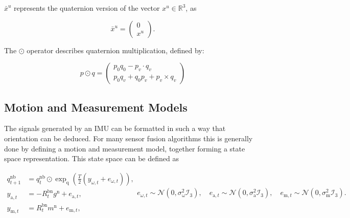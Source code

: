 $\bar{x}^u$ represents the quaternion version of the vector $x^u \in \mathbb{R}^3$, as

\begin{equation}
	\label{eq:quat_vec_ref}
	\bar{x}^u=\left(\begin{array}{l}{0} \\ {x^u}\end{array}\right).
\end{equation}


The $\odot$ operator describes quaternion multiplication, defined by:

\begin{equation}
	\label{eq:quat_multiplication}
	p \odot q=\left(\begin{array}{c}{p_{0} q_{0}-p_{v} \cdot q_{v}} \\ {p_{0} q_{v}+q_{0} p_{v}+p_{v} \times q_{v}}\end{array}\right)
\end{equation}

\subsection{Motion and Measurement Models}
\label{sec:motion_and_measurement_models}
The signals generated by an IMU can be formatted in such a way that orientation can be deduced. For many sensor fusion algorithms this is generally done by defining a motion and measurement model, together forming a state space representation. This state space can be defined as \cite{Kok2017}

\begin{subequations}
	\begin{align}
		\label{eq:orient_dynamics}
		q_{t+1}^{\mathrm{nb}} &=q_{t}^{\mathrm{nb}} \odot \exp _{\mathrm{q}}\left(\frac{T}{2}\left(y_{\omega, t}+e_{\omega, t}\right)\right), 	\\ 
		\label{eq:orient_acc_measure}
		y_{\mathrm{a}, t} &=-R_{t}^{\mathrm{bn}} g^{\mathrm{n}}+e_{\mathrm{a}, t},\\ 
		\label{eq:orient_mag_measure}
		y_{\mathrm{m}, t} &=R_{t}^{\mathrm{bn}} m^{\mathrm{n}}+e_{\mathrm{m}, t}, 
	\end{align}
	\begin{equation}
		\label{eq:orient_ss_noise}
		e_{\omega, t} \sim \mathcal{N}\left(0, \sigma_{\mathrm{\omega}}^{2} \mathcal{I}_{3}\right), 
		\quad 
		e_{\mathrm{a}, t} \sim \mathcal{N}\left(0, \sigma_{\mathrm{a}}^{2} \mathcal{I}_{3}\right), 
		\quad 
		e_{\mathrm{m}, t} \sim \mathcal{N}\left(0, \sigma_{\mathrm{m}}^{2} \mathcal{I}_{3}\right).
	\end{equation}
	\label{eq:orient_state_space}
\end{subequations}

